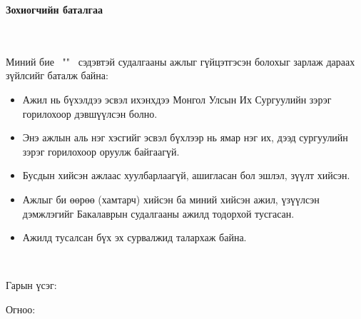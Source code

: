 \makefrontpage
\maketitle
\doublespace

\begin{huge}
\textbf{Зохиогчийн баталгаа}
\end{huge} \\ \ \\ 
\doublespace
Миний бие \@author \ "\@title" \ сэдэвтэй судалгааны ажлыг гүйцэтгэсэн болохыг зарлаж дараах зүйлсийг баталж байна:
\begin{itemize}
\item Ажил нь бүхэлдээ эсвэл ихэнхдээ Монгол Улсын Их Сургуулийн зэрэг горилохоор дэвшүүлсэн болно.
\item Энэ ажлын аль нэг хэсгийг эсвэл бүхлээр нь ямар нэг их, дээд сургуулийн зэрэг горилохоор оруулж байгаагүй.
\item Бусдын хийсэн ажлаас хуулбарлаагүй, ашигласан бол эшлэл, зүүлт хийсэн.
\item Ажлыг би өөрөө (хамтарч) хийсэн ба миний хийсэн ажил, үзүүлсэн дэмжлэгийг Бакалаврын судалгааны ажилд тодорхой тусгасан. 
\item Ажилд тусалсан бүх эх сурвалжид талархаж байна. 
\end{itemize} 
\ 

Гарын үсэг: \underline{\hspace{5cm}}

Огноо: 	\ \ \underline{\hspace{3cm}}

\setcounter{tocdepth}{1}
\tableofcontents

\listoffigures

\listoftables


\newpage
\newpage

\renewcommand{\cftlabel}{Зураг}


\doublespace
{}
